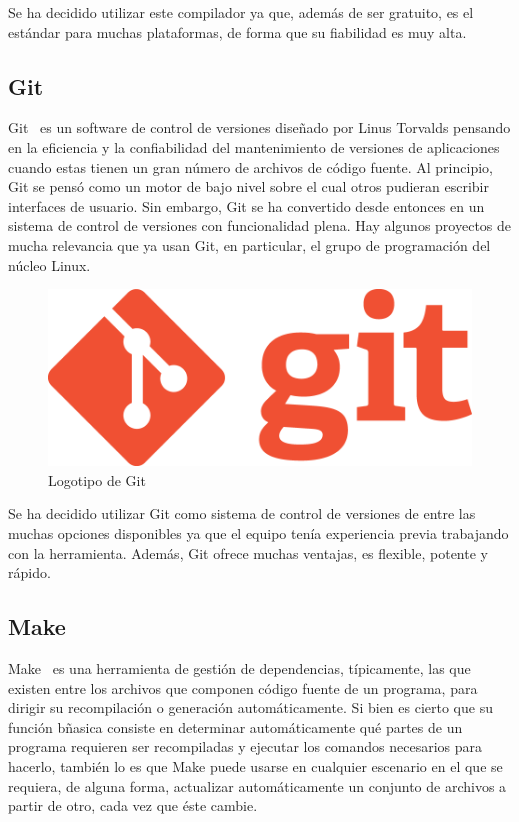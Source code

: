		\FloatBarrier

		Se ha decidido utilizar este compilador ya que, además de ser gratuito, es el estándar para muchas plataformas, de forma que su fiabilidad es muy alta.

	\subsection{Git}

		Git~\cite{git} es un software de control de versiones diseñado por Linus Torvalds pensando en la eficiencia y la confiabilidad del mantenimiento de versiones de aplicaciones cuando estas tienen un gran número de archivos de código fuente. Al principio, Git se pensó como un motor de bajo nivel sobre el cual otros pudieran escribir interfaces de usuario. Sin embargo, Git se ha convertido desde entonces en un sistema de control de versiones con funcionalidad plena. Hay algunos proyectos de mucha relevancia que ya usan Git, en particular, el grupo de programación del núcleo Linux.

		\begin{figure}[!htp]
			 \centering
			 \includegraphics[scale=.25]{fig/git}
			 \caption{Logotipo de Git}
			 \label{fig:git}
		\end{figure}

		\FloatBarrier

		Se ha decidido utilizar Git como sistema de control de versiones de entre las muchas opciones disponibles ya que el equipo tenía experiencia previa trabajando con la herramienta. Además, Git ofrece muchas ventajas, es flexible, potente y rápido.

	\subsection{Make}

		Make~\cite{make} es una herramienta de gestión de dependencias, típicamente, las que existen entre los archivos que componen código fuente de un programa, para dirigir su recompilación o generación automáticamente. Si bien es cierto que su función bñasica consiste en determinar automáticamente qué partes de un programa requieren ser recompiladas y ejecutar los comandos necesarios para hacerlo, también lo es que Make puede usarse en cualquier escenario en el que se requiera, de alguna forma, actualizar automáticamente un conjunto de archivos a partir de otro, cada vez que éste cambie.

